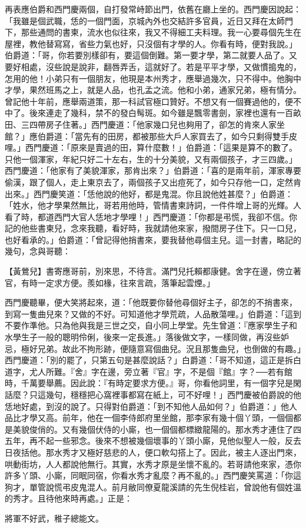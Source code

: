再表應伯爵和西門慶兩個，自打發常峙節出門，依舊在廳上坐的。西門慶因說起：「我雖是個武職，恁的一個門面，京城內外也交結許多官員，近日又拜在太師門下，那些通問的書柬，流水也似往來，我又不得細工夫料理。我一心要尋個先生在屋裡，教他替寫寫，省些力氣也好，只沒個有才學的人。你看有時，便對我說。」 伯爵道：「哥，你若要別樣卻有，要這個倒難。第一要才學，第二就要人品了。又要好相處，沒些說是說非，翻唇弄舌，這就好了。若是平平才學，又做慣搗鬼的，怎用的他！小弟只有一個朋友，他現是本州秀才，應舉過幾次，只不得中。他胸中才學，果然班馬之上，就是人品，也孔孟之流。他和小弟，通家兄弟，極有情分。曾記他十年前，應舉兩道策，那一科試官極口贊好。不想又有一個賽過他的，便不中了。後來連走了幾科，禁不的發白髩斑。如今雖是飄零書劍，家裡也還有一百畝田、三四帶房子住著。」西門慶道：「他家幾口兒也夠用了，卻怎的肯來人家坐館？」應伯爵道：「當先有的田房，都被那些大戶人家買去了，如今只剩得雙手皮哩。」西門慶道：「原來是賣過的田，算什麼數！」伯爵道：「這果是算不的數了。只他一個渾家，年紀只好二十左右，生的十分美貌，又有兩個孩子，才三四歲。」西門慶道：「他家有了美貌渾家，那肯出來？」伯爵道：「喜的是兩年前，渾家專要偷漢，跟了個人，走上東京去了，兩個孩子又出痘死了，如今只存他一口，定然肯出來。」西門慶笑道：「恁他說的他好，都是鬼混。你且說他姓甚麼？」伯爵道：「姓水，他才學果然無比，哥若用他時，管情書柬詩詞，一件件增上哥的光輝。人看了時，都道西門大官人恁地才學哩！」西門慶道：「你都是弔慌，我卻不信。你記的他些書柬兒，念來我聽，看好時，我就請他來家，撥間房子住下。只一口兒，也好看承的。」伯爵道：「曾記得他捎書來，要我替他尋個主兒。這一封書，略記的幾句，念與哥聽：

【黃鶯兒】書寄應哥前，別來思，不待言。滿門兒托賴都康健。舍字在邊，傍立著官，有時一定求方便。羨如椽，往來言疏，落筆起雲煙。」

西門慶聽畢，便大笑將起來，道：「他既要你替他尋個好主子，卻怎的不捎書來，到寫一隻曲兒來？又做的不好。可知道他才學荒疏，人品散蕩哩。」伯爵道：「這到不要作準他。只為他與我是三世之交，自小同上學堂。先生曾道：『應家學生子和水學生子一般的聰明伶俐，後來一定長進。」落後做文字，一樣同做，再沒些妒忌，極好兄弟。故此不拘形跡，便隨意寫個曲兒。況且那隻曲兒，也倒做的有趣。」西門慶道：「別的罷了，只第五句是甚麼說話？」白爵道：「哥不知道，這正是拆白道字，尤人所難。『舍』字在邊，旁立著『官』字，不是個『館』字？──若有館時，千萬要舉薦。因此說：『有時定要求方便。』哥，你看他詞里，有一個字兒是閑話麼？只這幾句，穩穩把心窩裡事都寫在紙上，可不好哩！」西門慶被伯爵說的他恁地好處，到沒的說了。只得對伯爵道：「到不知他人品如何？」伯爵道：」他人品比才學又高。前年，他在一個李侍郎府里坐館，那李家有幾十個丫頭，一個個都是美貌俊俏的。又有幾個伏侍的小廝，也一個個都標緻龍陽的。那水秀才連住了四五年，再不起一些邪念。後來不想被幾個壞事的丫頭小廝，見他似聖人一般，反去日夜括他。那水秀才又極好慈悲的人，便口軟勾搭上了。因此，被主人逐出門來，哄動街坊，人人都說他無行。其實，水秀才原是坐懷不亂的。若哥請他來家，憑你許多丫頭、小廝，同眠同宿，你看水秀才亂麼？再不亂的。」西門慶笑罵道：「你這狗才，單管說慌弔皮鬼混人。前月敝同僚夏龍溪請的先生倪桂岩，曾說他有個姓溫的秀才。且待他來時再處。」正是：

將軍不好武，稚子總能文。

